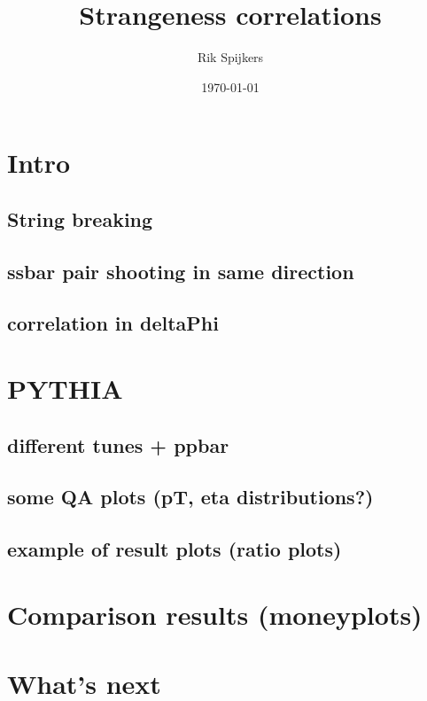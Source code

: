 \documentclass[compress,aspectratio=169]{beamer}
\title{Strangeness correlations}
\author{Rik Spijkers}
\date{\today}
\begin{document}
\begin{frame}
  \maketitle
\end{frame}

\begin{frame}
  \tableofcontents[]
\end{frame}

\section{Intro}
\subsection{String breaking}
\subsection{ssbar pair shooting in same direction}
\subsection{correlation in deltaPhi}
\section{PYTHIA}
\subsection{different tunes + ppbar}
\subsection{some QA plots (pT, eta distributions?)}
\subsection{example of result plots (ratio plots)}
\section{Comparison results (moneyplots)}
\section{What's next}
\section*{} %
\end{document}

